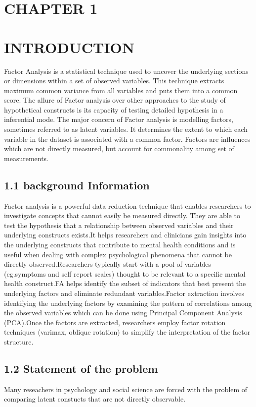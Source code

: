 \documentclass[12pt]{article}
\numberwithin{equation}{section}
\begin{document}
	\section*{CHAPTER 1}
\section*{INTRODUCTION}
Factor Analysis is a statistical technique used to uncover the underlying sections or dimensions within a set of observed variables. This technique extracts maximum common variance from all variables and puts them into a common score. The allure of Factor analysis over other approaches to the study of hypothetical constructs is its capacity of testing detailed hypothesis in a inferential mode. The major concern of Factor analysis is modelling factors, sometimes referred to as latent variables. It determines the extent to which each variable in the dataset is associated with a common factor. Factors are influences which are not directly measured, but account for commonality among set of measurements.

\subsection*{1.1 background Information}
Factor analysis is a powerful data reduction technique that enables researchers to investigate concepts that cannot easily be measured directly. They are able to test the hypothesis that a relationship between observed variables and their underlying constructs exists.It helps researchers and clinicians gain insights into the underlying constructs that contribute to mental health conditions and is useful when dealing with complex psychological phenomena that cannot be directly observed.Researchers typically start with a pool of variables (eg.symptoms and self report scales) thought to be relevant to a specific mental health construct.FA helps identify the subset of indicators that best present the underlying factors and eliminate redundant variables.Factor extraction involves identifying the underlying factors by examining the pattern of correlations among the observed variables which can be done using Principal Component Analysis (PCA).Once the factors are extracted, researchers employ factor rotation techniques (varimax, oblique rotation) to simplify the interpretation of the factor structure.

\subsection* {1.2 Statement of the problem}
\noindent Many reseachers in psychology and social science are forced with the problem of comparing latent constucts that are not directly observable.\\
\end{document}
